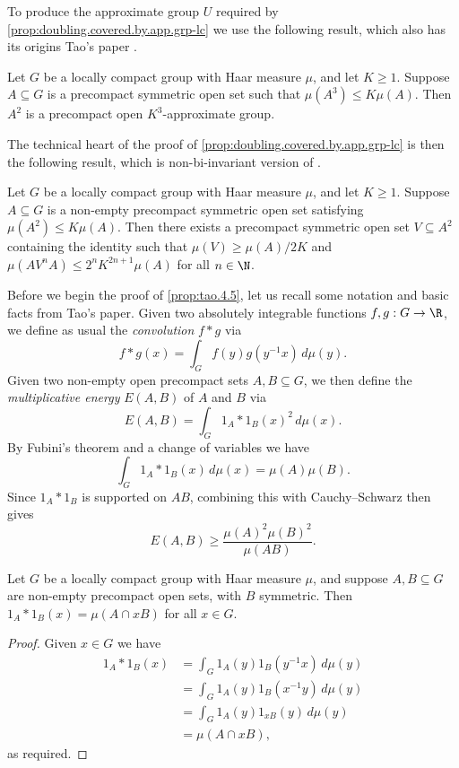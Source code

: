 To produce the approximate group $U$ required by \cref{prop:doubling.covered.by.app.grp-lc} we use the following result, which also has its origins Tao's paper \cite{tao.product.set}.
\begin{lemma}\label{lem:tripling->AG}
Let $G$ be a locally compact group with Haar measure $\mu$, and let $K\ge1$. Suppose $A\subseteq G$ is a precompact symmetric open set such that $\mu(A^3)\le K\mu(A)$. Then $A^2$ is a precompact open $K^3$-approximate group.
\end{lemma}
The technical heart of the proof of \cref{prop:doubling.covered.by.app.grp-lc} is then the following result, which is non-bi-invariant version of \cite[Proposition 4.5]{tao.product.set}.
\begin{prop}\label{prop:tao.4.5}
Let $G$ be a locally compact group with Haar measure $\mu$, and let $K\ge1$. Suppose $A\subseteq G$ is a non-empty precompact symmetric open set satisfying $\mu(A^2)\le K\mu(A)$. Then there exists a precompact symmetric open set $V\subseteq A^2$ containing the identity such that $\mu(V)\ge\mu(A)/2K$ and $\mu(AV^nA)\le2^nK^{2n+1}\mu(A)$ for all $n\in\N$.
\end{prop}
Before we begin the proof of \cref{prop:tao.4.5}, let us recall some notation and basic facts from Tao's paper. Given two absolutely integrable functions $f,g:G\to\R$, we define as usual the \emph{convolution} $f\ast g$ via
\[
f\ast g(x)=\int_Gf(y)g(y^{-1}x)\,d\mu(y).
\]
Given two non-empty open precompact sets $A,B\subseteq G$, we then define the \emph{multiplicative energy} $E(A,B)$ of $A$ and $B$ via
\[
E(A,B)=\int_G1_A\ast1_B(x)^2\,d\mu(x).
\]
By Fubini's theorem and a change of variables we have
\begin{equation}\label{eq:tao6}
\int_G1_A\ast1_B(x)\,d\mu(x)=\mu(A)\mu(B).
\end{equation}
Since $1_A\ast1_B$ is supported on $AB$, combining this with Cauchy--Schwarz then gives
\begin{equation}\label{eq:tao9}
E(A,B)\ge\frac{\mu(A)^2\mu(B)^2}{\mu(AB)}.
\end{equation}
\begin{lemma}\label{lem:1A*1B}
Let $G$ be a locally compact group with Haar measure $\mu$, and suppose $A,B\subseteq G$ are non-empty precompact open sets, with $B$ symmetric. Then $1_A\ast1_B(x)=\mu(A\cap xB)$ for all $x\in G$.
\end{lemma}
\begin{proof}
Given $x\in G$ we have
\begin{align*}
1_A\ast1_B(x)&=\int_G1_A(y)1_B(y^{-1}x)\,d\mu(y)\\
		&=\int_G1_A(y)1_B(x^{-1}y)\,d\mu(y)\\
		&=\int_G1_A(y)1_{xB}(y)\,d\mu(y)\\
		&=\mu(A\cap xB),
\end{align*}
as required.
\end{proof}
